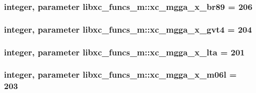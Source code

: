 \hypertarget{classlibxc__funcs__m_a826f3ff7cb5f29d448e9d4093f2733db}{
\subsubsection[{xc\-\_\-mgga\-\_\-x\-\_\-br89}]{\setlength{\rightskip}{0pt plus 5cm}integer, parameter libxc\-\_\-funcs\-\_\-m\-::xc\-\_\-mgga\-\_\-x\-\_\-br89 = 206}}\label{classlibxc__funcs__m_a826f3ff7cb5f29d448e9d4093f2733db}
\hypertarget{classlibxc__funcs__m_a1584fd172accdefa8bbc6fb7652aed56}{
\subsubsection[{xc\-\_\-mgga\-\_\-x\-\_\-gvt4}]{\setlength{\rightskip}{0pt plus 5cm}integer, parameter libxc\-\_\-funcs\-\_\-m\-::xc\-\_\-mgga\-\_\-x\-\_\-gvt4 = 204}}\label{classlibxc__funcs__m_a1584fd172accdefa8bbc6fb7652aed56}
\hypertarget{classlibxc__funcs__m_a85d415ad777487b51a126698b10dadc0}{
\subsubsection[{xc\-\_\-mgga\-\_\-x\-\_\-lta}]{\setlength{\rightskip}{0pt plus 5cm}integer, parameter libxc\-\_\-funcs\-\_\-m\-::xc\-\_\-mgga\-\_\-x\-\_\-lta = 201}}\label{classlibxc__funcs__m_a85d415ad777487b51a126698b10dadc0}
\hypertarget{classlibxc__funcs__m_a66f91e9dd26dc260eed7c6b1074b0f76}{
\subsubsection[{xc\-\_\-mgga\-\_\-x\-\_\-m06l}]{\setlength{\rightskip}{0pt plus 5cm}integer, parameter libxc\-\_\-funcs\-\_\-m\-::xc\-\_\-mgga\-\_\-x\-\_\-m06l = 203}}\label{classlibxc__funcs__m_a66f91e9dd26dc260eed7c6b1074b0f76}
